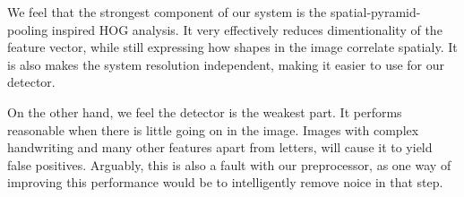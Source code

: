 \documentclass[paper=a4, fontsize=11pt]{scrartcl} %
\numberwithin{equation}{section} %
\numberwithin{figure}{section} %
\numberwithin{table}{section} %
\begin{document}
We feel that the strongest component of our system is the spatial-pyramid-pooling inspired HOG analysis.
It very effectively reduces dimentionality of the feature vector, while still expressing how shapes in the image correlate spatialy.
It is also makes the system resolution independent, making it easier to use for our detector.

On the other hand, we feel the detector is the weakest part.
It performs reasonable when there is little going on in the image.
Images with complex handwriting and many other features apart from letters, will cause it to yield false positives.
Arguably, this is also a fault with our preprocessor, as one way of improving this performance would be to intelligently remove noice in that step.


 
\end{document}

